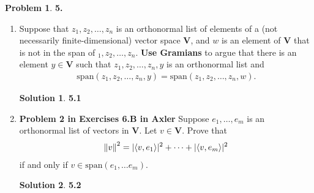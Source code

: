 \documentclass{article}
\theoremstyle{definition}
\newtheorem*{prob*}{Problem}
\newtheorem*{sln*}{Solution}
\newcommand{\V}{\mathbf{V}}
\newcommand{\xpan}{\text{span}}
\newcommand{\la}{\langle}
\newcommand{\ra}{\rangle}
\begin{document}
\begin{prob*}\textbf{5.}
	\begin{enumerate}
		\item Suppose that $z_1, z_2, \dots, z_n$ is an orthonormal list of elements of a (not necessarily finite-dimensional) vector space $\V$, and $w$ is an element of $\V$ that is not in the span of $_1,z_2,\dots,z_n$. \textbf{Use Gramians} to argue that there is an element $y\in \V$ such that $z_1, z_2,\dots,z_n, y$ is an orthonormal list and
		\begin{align*}
		\xpan(z_1,z_2,\dots,z_n,y) = \xpan(z_1,z_2,\dots,z_n,w).
		\end{align*}
		
		
		\begin{sln*}\textbf{5.1}
			
		\end{sln*}
	
	
		\newpage
		
		
		\item \textbf{Problem 2 in Exercises 6.B in Axler} Suppose $e_1,\dots,e_m$ is an orthonormal list of vectors in $\V$. Let $v\in \V$. Prove that 
		\begin{align*}
		\norm{v}^2= \vert \la v, e_1 \ra \vert^2 + \dots + \vert \la v, e_m \ra \vert^2
		\end{align*}
		if and only if $v\in \xpan(e_1, \dots e_m)$.
		
		
		
		\begin{sln*}\textbf{5.2}
			
		\end{sln*}
	\end{enumerate}
\end{prob*}
\end{document}
